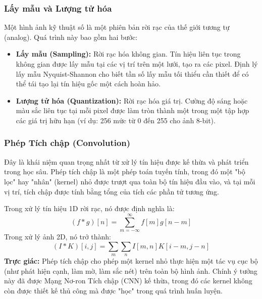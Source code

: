 \subsubsection{Lấy mẫu và Lượng tử hóa}
Một hình ảnh kỹ thuật số là một phiên bản rời rạc của thế giới tương tự (analog). Quá trình này bao gồm hai bước:
\begin{itemize}
    \item \textbf{Lấy mẫu (Sampling):} Rời rạc hóa không gian. Tín hiệu liên tục trong không gian được lấy mẫu tại các vị trí trên một lưới, tạo ra các pixel. Định lý lấy mẫu Nyquist-Shannon cho biết tần số lấy mẫu tối thiểu cần thiết để có thể tái tạo lại tín hiệu gốc một cách hoàn hảo.
    \item \textbf{Lượng tử hóa (Quantization):} Rời rạc hóa giá trị. Cường độ sáng hoặc màu sắc liên tục tại mỗi pixel được làm tròn thành một trong một tập hợp các giá trị hữu hạn (ví dụ: 256 mức từ 0 đến 255 cho ảnh 8-bit).
\end{itemize}

\subsubsection{Phép Tích chập (Convolution)}
Đây là khái niệm quan trọng nhất từ xử lý tín hiệu được kế thừa và phát triển trong học sâu. Phép tích chập là một phép toán tuyến tính, trong đó một "bộ lọc" hay "nhân" (kernel) nhỏ được trượt qua toàn bộ tín hiệu đầu vào, và tại mỗi vị trí, tích chập được tính bằng tổng của tích các phần tử tương ứng.

Trong xử lý tín hiệu 1D rời rạc, nó được định nghĩa là:
\begin{equation}
    (f * g)[n] = \sum_{m=-\infty}^{\infty} f[m]g[n-m]
\end{equation}
Trong xử lý ảnh 2D, nó trở thành:
\begin{equation}
    (I * K)[i, j] = \sum_{m}\sum_{n} I[m, n]K[i-m, j-n]
\end{equation}
\textbf{Trực giác:} Phép tích chập cho phép một kernel nhỏ thực hiện một tác vụ cục bộ (như phát hiện cạnh, làm mờ, làm sắc nét) trên toàn bộ hình ảnh. Chính ý tưởng này đã được Mạng Nơ-ron Tích chập (CNN) kế thừa, trong đó các kernel không còn được thiết kế thủ công mà được "học" trong quá trình huấn luyện.

